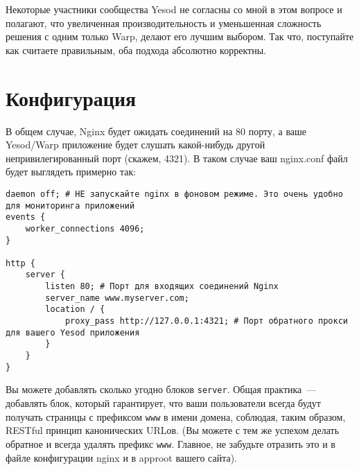 Некоторые участники сообщества Yesod не согласны со мной в этом вопросе и полагают, что увеличенная производительность и уменьшенная сложность решения с одним только Warp, делают его лучшим выбором. Так что, поступайте как считаете правильным, оба подхода абсолютно корректны.

%
\section{Конфигурация}
%
%
В общем случае, Nginx будет ожидать соединений на 80 порту, а ваше Yesod/Warp приложение будет слушать какой-нибудь другой непривилегированный порт (скажем, 4321). В таком случае ваш nginx.conf файл будет выглядеть примерно так:

%
%
\begin{lstlisting}
daemon off; # НЕ запускайте nginx в фоновом режиме. Это очень удобно для мониторинга приложений
events {
    worker_connections 4096;
}

http {
    server {
        listen 80; # Порт для входящих соединений Nginx
        server_name www.myserver.com;
        location / {
            proxy_pass http://127.0.0.1:4321; # Порт обратного прокси для вашего Yesod приложения
        }
    }
}
\end{lstlisting}
%

Вы можете добавлять сколько угодно блоков \lstinline{server}. Общая практика~--- добавлять блок, который гарантирует, что ваши пользователи всегда будут получать страницы с префиксом \lstinline{www} в имени домена, соблюдая, таким образом, RESTful принцип канонических URLов. (Вы можете с тем же успехом делать обратное и всегда удалять префикс \lstinline{www}. Главное, не забудьте отразить это и в файле конфигурации nginx и в approot вашего сайта).

